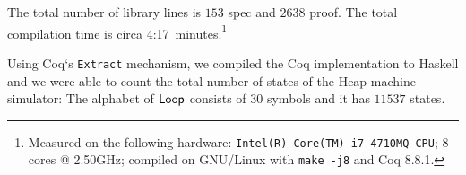 The total number of library lines is $153$ spec and $2638$ proof.  The total compilation time is circa 4:17~minutes.\footnote{Measured on the
  following hardware: \texttt{Intel(R) Core(TM) i7-4710MQ CPU}; 8 cores @ 2.50GHz; compiled on GNU/Linux with \texttt{make -j8} and Coq 8.8.1.}

Using Coq`s \texttt{Extract} mechanism, we compiled the Coq implementation to Haskell and we were able to count the total number of states of the Heap
machine simulator: The alphabet of $\mathsf{Loop}$ consists of $30$ symbols and it has $11537$ states.



